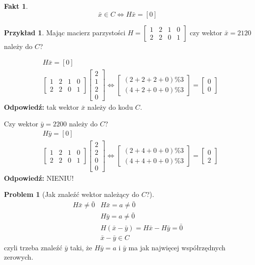 \documentclass[a4paper,12pt]{article}
\theoremstyle{definition}%
\newtheorem{fact}{Fakt} %
\newtheorem{example}{Przykład}
\newtheorem*{example*}{Przykład} %
\theoremstyle{definition}
\theoremstyle{problem}
\newtheorem{problem}{Problem}%
\begin{document}
\begin{fact}
$$\bar{x}\in C\Leftrightarrow H\bar{x}=[0]$$
\end{fact}
\begin{example*}
Mając macierz parzystości $H=\begin{bmatrix}
1&2&1&0\\2&2&0&1
\end{bmatrix}$ czy wektor $\bar{x}=2120$ należy do $C$?

\begin{align*}
&H\bar{x}=[0]\\
&\begin{bmatrix}
1&2&1&0\\2&2&0&1
\end{bmatrix}\begin{bmatrix}
2\\1\\2\\0
\end{bmatrix}\Leftrightarrow \begin{bmatrix}
(2+2+2+0)\%3\\
(4+2+0+0)\%3
\end{bmatrix}=\begin{bmatrix}
0\\0
\end{bmatrix}
\end{align*}
\textbf{Odpowiedź: }tak wektor $\bar{x}$ należy do kodu $C$.

Czy wektor $\bar{y}=2200$ należy do $C$?
\begin{align*}
&H\bar{y}=[0]\\
&\begin{bmatrix}
1&2&1&0\\2&2&0&1
\end{bmatrix}\begin{bmatrix}
2\\2\\0\\0
\end{bmatrix}\Leftrightarrow \begin{bmatrix}
(2+4+0+0)\%3\\
(4+4+0+0)\%3
\end{bmatrix}=\begin{bmatrix}
0\\2
\end{bmatrix}
\end{align*}
\textbf{Odpowiedź: }NIENIU!
\end{example*}
\begin{problem}[Jak znaleźć wektor należący do $C$?]
\begin{align*}
H\bar{x}\neq \bar{0}& H\bar{x}=a\neq \bar{0}\\
&H\bar{y} =a\neq\bar{0}\\
&H(\bar{x}-\bar{y})=H\bar{x}-H\bar{y}=\bar{0}\\
&\bar{x}-\bar{y}\in C
\end{align*}
czyli trzeba znaleźć $\bar{y}$ taki, że $H\bar{y}=a$ i $\bar{y}$ ma jak najwięcej współrzędnych zerowych.
\end{problem}
\end{document}
